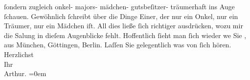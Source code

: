 \begin{ledgroupsized}[t]{13cm}
               ſondern zugleich onkel- majors- mädchen- gutsbeſitzer- träumerhaft ins Auge ſchauen.
               Gewöhnlich ſchreibt über die Dinge Einer, der nur ein Onkel, {\pb}nur ein Träumer, nur ein Mädchen iſt. All dies ließe ſich
               richtiger ausdrücken, wozu mir die Sa{\geminationm}lung in dieſem
               Augenblicke fehlt.\pend
           \pstart
           Hoffentlich ſieht man ſich wieder we{\geminationn} Sie \label{K_L01638_2v}\label{K_L01638_2h}, aus München, Göttingen, Berlin. Laſſen Sie
               gelegentlich was von ſich hören.\pend
           \pstart
           Herzlichst{\\[\baselineskip]}Ihr{\\[\baselineskip]}\spacefill\mbox{Arthur.}\pend
           \leftskip=0em{}
         
         \endnumbering{}\end{ledgroupsized}  \newcommand{\dateiname}{L01638}\newcommand{\titel}{Arthur Schnitzler an Hugo von Hofmannsthal, 27. 11. 1906}\newcommand{\editorInnen}{Martin Anton Müller und Gerd-Hermann Susen}
      